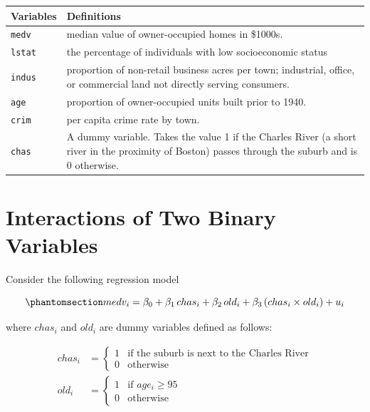 \documentclass[
  12pt,
  a4paper,
]{scrbook}
\newcounter{none} %
\theoremstyle{plain}
\theoremstyle{definition}
\theoremstyle{remark}
\begin{document}
{\def\LTcaptype{none} %
\begin{longtable}[]{@{}
  >{\raggedright\arraybackslash}p{}
  >{\raggedright\arraybackslash}p{}@{}}
\toprule\noalign{}
\begin{minipage}[b]{\linewidth}\raggedright
Variables
\end{minipage} & \begin{minipage}[b]{\linewidth}\raggedright
Definitions
\end{minipage} \\
\midrule\noalign{}
\endhead
\bottomrule\noalign{}
\endlastfoot
\texttt{medv} & median value of owner-occupied homes in {\$1000s}. \\
\texttt{lstat} & the percentage of individuals with low socioeconomic
status \\
\texttt{indus} & proportion of non-retail business acres per town;
industrial, office, or commercial land not directly serving
consumers. \\
\texttt{age} & proportion of owner-occupied units built prior to
1940. \\
\texttt{crim} & per capita crime rate by town. \\
\texttt{chas} & A dummy variable. Takes the value 1 if the Charles River
(a short river in the proximity of Boston) passes through the suburb and
is 0 otherwise. \\
\end{longtable}
}

\section{Interactions of Two Binary
Variables}\label{interactions-of-two-binary-variables}

Consider the following regression model

\begin{equation}\protect\phantomsection\label{eq-binary-interaction}{
medv_i = \beta_0 + \beta_1\, chas_i + \beta_2\, old_i + \beta_3\, (chas_i \times old_i) + u_i
}\end{equation}

where \(chas_i\) and \(old_i\) are dummy variables defined as follows:

\[
\begin{aligned}
chas_i &= \begin{cases}
1 & \text{if the suburb is next to the Charles River} \\
0 & \text{otherwise}
\end{cases} \\
old_i &= \begin{cases}
1 & \text{if } age_i \ge 95 \\
0 & \text{otherwise}
\end{cases}
\end{aligned}
\]
\end{document}

